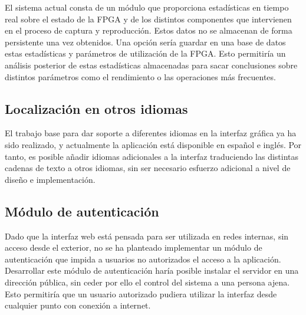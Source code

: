 El sistema actual consta de un módulo que proporciona estadísticas en tiempo real sobre el estado de la \gls{FPGA} y de los distintos componentes que intervienen en el proceso de captura y reproducción. Estos datos no se almacenan de forma persistente una vez obtenidos. Una opción sería guardar en una base de datos estas estadísticas y parámetros de utilización de la \gls{FPGA}. Esto permitiría un análisis posterior de estas estadísticas almacenadas para sacar conclusiones sobre distintos parámetros como el rendimiento o las operaciones más frecuentes.


\subsection*{Localización en otros idiomas}

El trabajo base para dar soporte a diferentes idiomas en la interfaz gráfica ya ha sido realizado, y actualmente la aplicación está disponible en español e inglés. Por tanto, es posible añadir idiomas adicionales a la interfaz traduciendo las distintas cadenas de texto a otros idiomas, sin ser necesario esfuerzo adicional a nivel de diseño e implementación.


\subsection*{Módulo de autenticación}

Dado que la interfaz web está pensada para ser utilizada en redes internas, sin acceso desde el exterior, no se ha planteado implementar un módulo de autenticación que impida a usuarios no autorizados el acceso a la aplicación. Desarrollar este módulo de autenticación haría posible instalar el servidor en una dirección pública, sin ceder por ello el control del sistema a una persona ajena. Esto permitiría que un usuario autorizado pudiera utilizar la interfaz desde cualquier punto con conexión a internet.